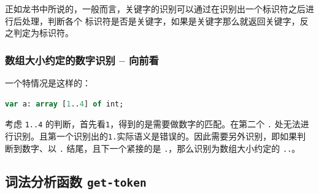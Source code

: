\documentclass[lang=cn]{elegantpaper}
\begin{document}
正如龙书中所说的，一般而言，关键字的识别可以通过在识别出一个标识符之后进行后处理，判断各个
标识符是否是关键字，如果是关键字那么就返回关键字，反之判定为标识符。

\subsubsection{数组大小约定的数字识别 -- 向前看}

一个特情况是这样的：

\begin{lstlisting}[language=pascal]
var a: array [1..4] of int;
\end{lstlisting}

考虑 \lstinline|1..4| 的判断，首先看\lstinline|1|，得到的是需要做数字的匹配。在第二个 \lstinline|.| 
处无法进行识别。且第一个识别出的\lstinline|1.|实际语义是错误的。因此需要另外识别，即如果判断到数字、以 
\lstinline|.| 结尾，且下一个紧接的是 \lstinline|.|，那么识别为数组大小约定的 \lstinline|..|。

\subsection{词法分析函数 \lstinline|get-token|}
\end{document}
